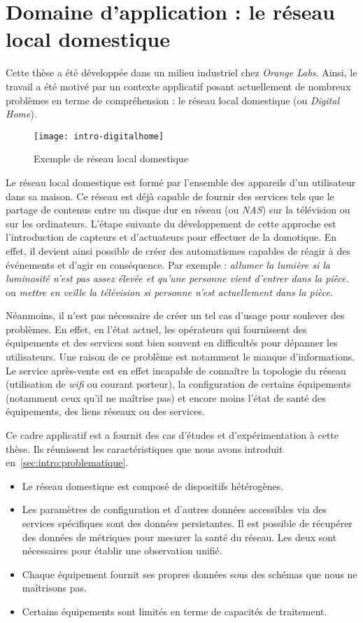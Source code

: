 \section{Domaine d'application : le réseau local domestique}\label{sec:introduction:digitalhome}
Cette thèse a été développée dans un milieu industriel chez \textit{Orange Labs}. Ainsi, le travail a été motivé par un contexte applicatif posant actuellement de nombreux problèmes en terme de compréhension : le réseau local domestique (ou \textit{Digital Home}).

\begin{figure}[ht]
\centering
\texttt{[image: intro-digitalhome]}
\caption{Exemple de réseau local domestique}
\end{figure}

Le réseau local domestique est formé par l'ensemble des appareils d'un utilisateur dans sa maison. Ce réseau est déjà capable de fournir des services tels que le partage de contenus entre un disque dur en réseau (ou \textit{NAS}) sur la télévision ou sur les ordinateurs. L'étape suivante du développement de cette approche est l'introduction de capteurs et d'actuateurs pour effectuer de la domotique. En effet, il devient ainsi possible de créer des automatismes capables de réagir à des événements et d'agir en conséquence. Par exemple : \textit{allumer la lumière si la luminosité n'est pas assez élevée et qu'une personne vient d'entrer dans la pièce.} ou \textit{mettre en veille la télévision si personne n'est actuellement dans la pièce}.

Néanmoins, il n'est pas nécessaire de créer un tel cas d'usage pour soulever des problèmes. En effet, en l'état actuel, les opérateurs qui fournissent des équipements et des services sont bien souvent en difficultés pour dépanner les utilisateurs. Une raison de ce problème est notamment le manque d'informations. Le service après-vente est en effet incapable de connaître la topologie du réseau (utilisation de \textit{wifi} ou courant porteur), la configuration de certains équipements (notamment ceux qu'il ne maîtrise pas) et encore moins l'état de santé des équipements, des liens réseaux ou des services.

Ce cadre applicatif est a fournit des cas d'études et d'expérimentation à cette thèse. Ils réunissent les caractéristiques que nous avons introduit en~\ref{sec:intro:problematique}.
\begin{itemize}
	\item Le réseau domestique est composé de dispositifs hétérogènes.
	\item Les paramètres de configuration et d'autres données accessibles via des services spécifiques sont des données persistantes. Il est possible de récupérer des données de métriques pour mesurer la santé du réseau. Les deux sont nécessaires pour établir une observation unifié.
	\item Chaque équipement fournit ses propres données sous des schémas que nous ne maîtrisons pas.
	\item Certains équipements sont limités en terme de capacités de traitement.
\end{itemize}

